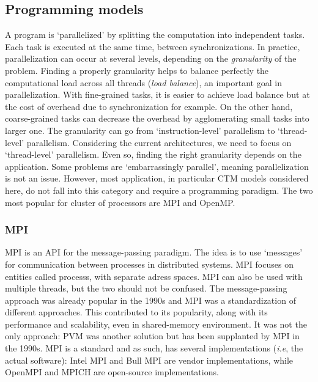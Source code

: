 \subsection{Programming models}
A program is `parallelized' by splitting the computation into independent tasks.
Each task is executed at the same time, between synchronizations. In practice,
parallelization can occur at several levels, depending on the
\textit{granularity} of the problem. Finding a properly granularity helps to
balance perfectly the computational load across all threads (\textit{load
balance}), an important goal in parallelization. With fine-grained tasks, it is
easier to achieve load balance but at the cost of \gls{overhead} due to
synchronization for example. On the other hand, coarse-grained tasks can decrease
the overhead by agglomerating small tasks into larger one. The granularity can
go from `instruction-level' parallelism to `thread-level' parallelism.
Considering the current architectures, we need to focus on `thread-level'
parallelism. Even so, finding the right granularity depends on the
application.
Some problems are `embarrassingly parallel', meaning parallelization is not an
issue. However, most application, in particular CTM models considered here, do
not fall into this category and require a programming paradigm. The two most
popular for cluster of processors are MPI and OpenMP\@.

\subsubsection{MPI}
\gls{MPI} is an \gls{API} for the message-passing paradigm. The
idea is to use `messages' for communication between processes in distributed
systems. MPI focuses on entities called \glspl{process}, with separate adress
spaces. MPI can also be used with multiple \glspl{thread}, but the two should
not be confused. The message-passing approach was already popular in the 1990s
and MPI was a standardization of different approaches. This contributed to its
popularity, along with its performance and scalability, even in shared-memory
environment.  It was not the only approach: \gls{PVM} was another solution but
has been supplanted by MPI in the 1990s. MPI is a standard and as such, has
several implementations (\textit{i.e}, the actual software): Intel MPI and Bull
MPI are vendor implementations, while OpenMPI and MPICH are open-source
implementations.

